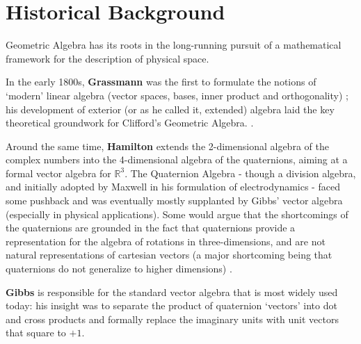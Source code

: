 \section{Historical Background}
Geometric Algebra has its roots in the long-running pursuit of a mathematical framework for the description of physical space.

In the early 1800s, \textbf{Grassmann} was the first to formulate the notions of `modern' linear algebra (vector spaces, bases, inner product and orthogonality) \cite{grassmann}; his development of exterior (or as he called it, extended) algebra laid the key theoretical groundwork for Clifford's Geometric Algebra. \cite[p.28-29]{ga-foundations}.

Around the same time, \textbf{Hamilton} extends the 2-dimensional algebra of the complex numbers into the 4-dimensional algebra of the quaternions, aiming at a formal vector algebra for $\mathbb{R}^3$.
The Quaternion Algebra - though a division algebra, and initially adopted by Maxwell in his formulation of electrodynamics - faced some pushback and was eventually mostly supplanted by Gibbs' vector algebra (especially in physical applications). Some would argue that the shortcomings of the quaternions are grounded in the fact that quaternions provide a representation for the algebra of rotations in three-dimensions, and are not natural representations of cartesian vectors (a major shortcoming being that quaternions do not generalize to higher dimensions) \cite{ga-history}.

\textbf{Gibbs} is responsible for the standard vector algebra that is most widely used today: his insight was to separate the product of quaternion `vectors' into dot and cross products and formally replace the imaginary units with unit vectors that square to $+1$.

